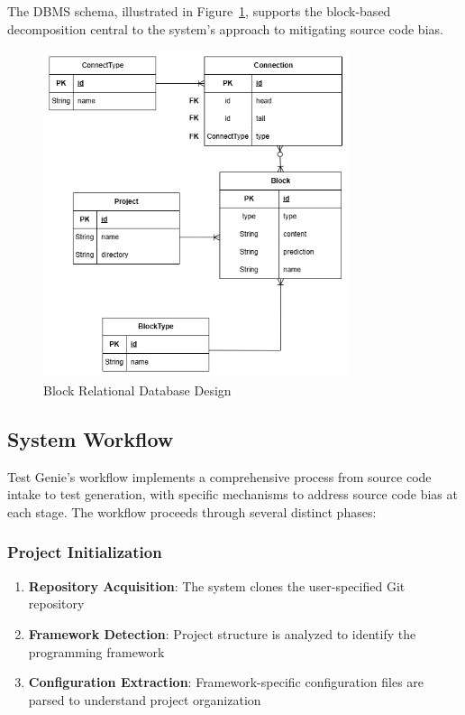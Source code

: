 \hspace{0.5cm}The DBMS schema, illustrated in Figure~\ref{fig:block-erd}, supports the block-based decomposition central to the system's approach to mitigating source code bias.

\begin{figure}[H]
	\centering
	\includegraphics[width=0.8\textwidth]{images/DB block design.drawio.png}
	\caption{Block Relational Database Design}
	\label{fig:block-erd}
\end{figure}

\subsection{System Workflow}

\hspace{0.5cm}Test Genie's workflow implements a comprehensive process from source code intake to test generation, with specific mechanisms to address source code bias at each stage. The workflow proceeds through several distinct phases:

\subsubsection{Project Initialization}

\begin{enumerate}
    \item \textbf{Repository Acquisition}: The system clones the user-specified Git repository
    \item \textbf{Framework Detection}: Project structure is analyzed to identify the programming framework
    \item \textbf{Configuration Extraction}: Framework-specific configuration files are parsed to understand project organization
\end{enumerate}

